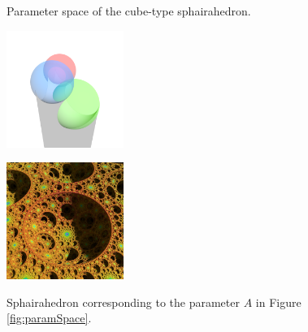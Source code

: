\begin{figure}[htbp]
\begin{minipage}[t]{0.24\textwidth}
\begin{tikzpicture}[line cap=round,line join=round,>=triangle
 45,x=1cm,y=1cm]
\end{tikzpicture}
  \caption{Parameter space of the cube-type sphairahedron.}
  \label{fig:paramSpace}
 \end{minipage}
 \hspace*{\fill}
 \begin{minipage}[t]{0.5\textwidth}
  \begin{minipage}[t]{0.24\textwidth}
   \centering
   \includegraphics[width=1.5in, height=1.5in, keepaspectratio]{./img/application/sphairahedron/derivation/prism-0864.png}
   \label{fig:pointASphaira}
  \end{minipage}
  \hspace*{\fill}
  \begin{minipage}[t]{0.24\textwidth}
   \centering
   \includegraphics[width=1.5in, height=1.5in, keepaspectratio]{./img/application/sphairahedron/derivation/limit-0864.jpg}
   \label{fig:pointALimit}
  \end{minipage}
  \hspace*{\fill}
  \caption{Sphairahedron corresponding to the parameter $A$ in
  Figure \ref{fig:paramSpace}.}
  \label{fig:pointA}
 \end{minipage}
\end{figure}

